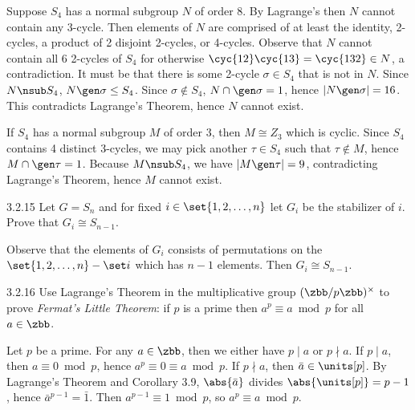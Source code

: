 \begin{sol}
    Suppose $S_4$ has a normal subgroup $N$ of order 8.
	By Lagrange's then $N$ cannot contain any 3-cycle.
	Then elements of $N$ are comprised of at least the identity, 2-cycles, a product of 2 disjoint 2-cycles, or 4-cycles.
	Observe that $N$ cannot contain all 6 2-cycles of $S_4$ for otherwise $\cyc{1 2}\cyc{1 3} = \cyc{1 3 2} \in N$, a contradiction.
	It must be that there is some 2-cycle $\sigma \in S_4$ that is not in $N$.
	Since $N \nsub S_4$, $N \gen\sigma \leq S_4$.
	Since $\sigma \notin S_4$, $N \cap \gen\sigma = 1$, hence $|N \gen\sigma| = 16$.
	This contradicts Lagrange's Theorem, hence $N$ cannot exist.

    If $S_4$ has a normal subgroup $M$ of order 3, then $M \cong Z_3$ which is cyclic.
	Since $S_4$ contains 4 distinct 3-cycles, we may pick another $\tau \in S_4$ such that $\tau \notin M$, hence $M \cap \gen\tau = 1$.
	Because $M \nsub S_4$, we have $|M \gen\tau| = 9$, contradicting Lagrange's Theorem, hence $M$ cannot exist.
\end{sol}

\begin{exercise}{3.2.15}
    Let $G = S_n$ and for fixed $i \in \set{1, 2, \dots, n}$ let $G_i$ be the stabilizer of $i$.
	Prove that $G_i \cong S_{n-1}$.
\end{exercise}

\begin{sol}
    Observe that the elements of $G_i$ consists of permutations on the $\set{1, 2, \ldots, n} - \set i$ which has $n - 1$ elements.
	Then $G_i \cong S_{n - 1}$.
\end{sol}

\begin{exercise}{3.2.16}
    Use Lagrange's Theorem in the multiplicative group $(\zbb/p\zbb)^\times$ to prove \emph{Fermat's Little Theorem}: if $p$ is a prime then $a^p \equiv a \bmod p$ for all $a \in \zbb$.
\end{exercise}

\begin{sol}
    Let $p$ be a prime.
	For any $a \in \zbb$, then we either have $p \mid a$ or $p \nmid a$.
	If $p \mid a$, then $a \equiv 0 \bmod p$, hence $a^p \equiv 0 \equiv a \bmod p$.
	If $p \nmid a$, then $\bar a \in \units[p]$.
	By Lagrange's Theorem and Corollary 3.9, $\abs{\bar a}$ divides $\abs{\units[p]} = p - 1$, hence $\bar a^{p - 1} = \bar 1$.
	Then $a^{p - 1} \equiv 1 \bmod p$, so $a^p \equiv a \bmod p$.
\end{sol}

